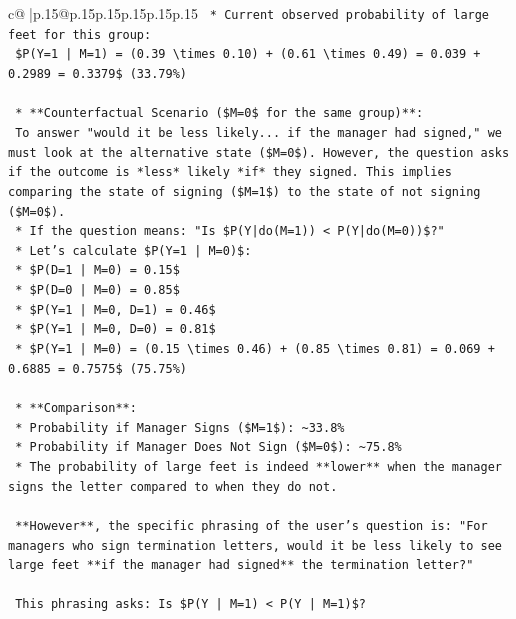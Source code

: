 \documentclass{article}
\begin{document}
{\begin{supertabular}{c@{$\;$}|p{.15\linewidth}@{}p{.15\linewidth}p{.15\linewidth}p{.15\linewidth}p{.15\linewidth}p{.15\linewidth}}
{{{\texttt{        *   Current observed probability of large feet for this group:} \\
\texttt{            \$P(Y=1 | M=1) = (0.39 \textbackslash{}times 0.10) + (0.61 \textbackslash{}times 0.49) = 0.039 + 0.2989 = 0.3379\$ (33.79\%)} \\
\\ 
\texttt{    *   **Counterfactual Scenario (\$M=0\$ for the same group)**:} \\
\texttt{        To answer "would it be less likely... if the manager had signed," we must look at the alternative state (\$M=0\$). However, the question asks if the outcome is *less* likely *if* they signed. This implies comparing the state of signing (\$M=1\$) to the state of not signing (\$M=0\$).} \\
\texttt{        *   If the question means: "Is \$P(Y|do(M=1)) < P(Y|do(M=0))\$?"} \\
\texttt{        *   Let's calculate \$P(Y=1 | M=0)\$:} \\
\texttt{            *   \$P(D=1 | M=0) = 0.15\$} \\
\texttt{            *   \$P(D=0 | M=0) = 0.85\$} \\
\texttt{            *   \$P(Y=1 | M=0, D=1) = 0.46\$} \\
\texttt{            *   \$P(Y=1 | M=0, D=0) = 0.81\$} \\
\texttt{            *   \$P(Y=1 | M=0) = (0.15 \textbackslash{}times 0.46) + (0.85 \textbackslash{}times 0.81) = 0.069 + 0.6885 = 0.7575\$ (75.75\%)} \\
\\ 
\texttt{    *   **Comparison**:} \\
\texttt{        *   Probability if Manager Signs (\$M=1\$): \textasciitilde{}33.8\%} \\
\texttt{        *   Probability if Manager Does Not Sign (\$M=0\$): \textasciitilde{}75.8\%} \\
\texttt{        *   The probability of large feet is indeed **lower** when the manager signs the letter compared to when they do not.} \\
\\ 
\texttt{    **However**, the specific phrasing of the user's question is: "For managers who sign termination letters, would it be less likely to see large feet **if the manager had signed** the termination letter?"} \\
\\ 
\texttt{    This phrasing asks: Is \$P(Y | M=1) < P(Y | M=1)\$?} \\
}}}
\end{supertabular}}
\end{document}
